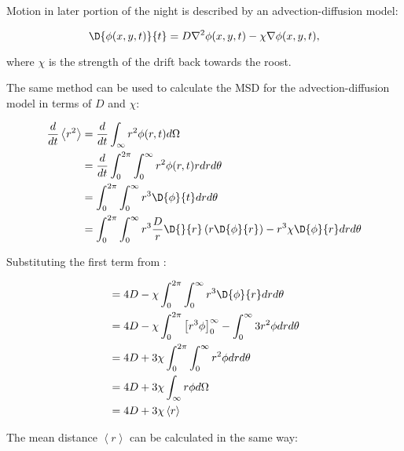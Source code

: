 Motion in later portion of the night is described by an advection-diffusion model:

\begin{equation}
  \D{\phi(x,y,t)}{t} = D \nabla^2 \phi(x,y,t) - \chi \nabla \phi(x,y,t),
  \nonumber
\end{equation}

where $\chi$ is the strength of the drift back towards the roost.

The same method can be used to calculate the MSD for the advection-diffusion model in terms of $D$ and $\chi$:

\begin{equation}
\begin{split}
\frac{d}{dt} \left<r^2\right> &= \frac{d}{dt}\int_{\infty}r^2 \phi(r,t) d\Omega \\
                              &= \frac{d}{dt} \int_0^{2\pi}\int_0^{\infty} r^2 \phi(r,t) r dr d\theta \\
                              &= \int_0^{2\pi} \int_0^{\infty} r^3 \D{\phi}{t} dr d\theta \\
                              &= \int_0^{2\pi} \int_0^{\infty} r^3 \frac{D}{r} \D{}{r}\left(r \D{\phi}{r}\right)- r^3\chi\D{\phi}{r} dr d\theta \\
\end{split}
\end{equation}


Substituting the first term from :

\begin{equation}
\begin{split}
                              &= 4D - \chi \int_0^{2\pi} \int_0^{\infty} r^3 \D{\phi}{r} dr d\theta \\
                              &= 4D - \chi \int_0^{2\pi} \left[ r^3 \phi \right]_0^{\infty} - \int_0^{\infty}  3 r^2 \phi dr d\theta \\
                              &= 4D + 3\chi \int_0^{2\pi} \int_0^{\infty}  r^2 \phi dr d\theta  \\
                              &= 4D + 3\chi \int_{\infty} r \phi d\Omega \\
                              &= 4D + 3\chi \left<r\right>
\nonumber
\end{split}
\end{equation}

The mean distance $ \left<r\right>$ can be calculated in the same way:

